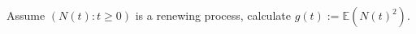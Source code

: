 \documentclass{ctexart}
\newif\ifpreface
\begin{document}
\large
\setlength{\baselineskip}{1.2em}
\ifpreface
    
\else
\fi
{}
\begin{problem}\label{pro:1}
Assume \((N(t):t \geq 0)\) is a renewing process, calculate \(g(t):=\mathbb{E}(N(t)^2)\).  
\end{problem}
\begin{problem}\label{pro:2}
  
\end{problem}
\end{document}
